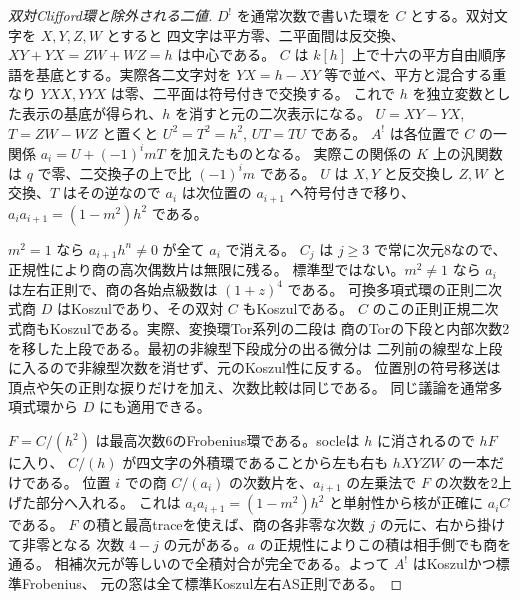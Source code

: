 \begin{proof}[双対Clifford環と除外される二値]
$D^!$ を通常次数で書いた環を $C$ とする。双対文字を $X,Y,Z,W$ とすると
四文字は平方零、二平面間は反交換、$XY+YX=ZW+WZ=h$ は中心である。
$C$ は $k[h]$ 上で十六の平方自由順序語を基底とする。実際各二文字対を
$YX=h-XY$ 等で並べ、平方と混合する重なり $YXX,YYX$ は零、二平面は符号付きで交換する。
これで $h$ を独立変数とした表示の基底が得られ、$h$ を消すと元の二次表示になる。
$U=XY-YX$, $T=ZW-WZ$ と置くと $U^2=T^2=h^2$, $UT=TU$ である。
$A^!$ は各位置で $C$ の一関係 $a_i=U+(-1)^i mT$ を加えたものとなる。
実際この関係の $K$ 上の汎関数は $q$ で零、二交換子の上で比 $(-1)^i m$ である。
$U$ は $X,Y$ と反交換し $Z,W$ と交換、$T$ はその逆なので $a_i$ は次位置の
$a_{i+1}$ へ符号付きで移り、$a_i a_{i+1}=(1-m^2)h^2$ である。

$m^2=1$ なら $a_{i+1}h^n\ne0$ が全て $a_i$ で消える。
$C_j$ は $j\ge3$ で常に次元8なので、正規性により商の高次偶数片は無限に残る。
標準型ではない。$m^2\ne1$ なら $a_i$ は左右正則で、商の各始点級数は $(1+z)^4$ である。
可換多項式環の正則二次式商 $D$ はKoszulであり、その双対 $C$ もKoszulである。
$C$ のこの正則正規二次式商もKoszulである。実際、変換環Tor系列の二段は
商のTorの下段と内部次数2を移した上段である。最初の非線型下段成分の出る微分は
二列前の線型な上段に入るので非線型次数を消せず、元のKoszul性に反する。
位置別の符号移送は頂点や矢の正則な捩りだけを加え、次数比較は同じである。
同じ議論を通常多項式環から $D$ にも適用できる。

$F=C/(h^2)$ は最高次数6のFrobenius環である。socleは $h$ に消されるので $hF$ に入り、
$C/(h)$ が四文字の外積環であることから左も右も $hXYZW$ の一本だけである。
位置 $i$ での商 $C/(a_i)$ の次数片を、$a_{i+1}$ の左乗法で $F$ の次数を2上げた部分へ入れる。
これは $a_i a_{i+1}=(1-m^2)h^2$ と単射性から核が正確に $a_i C$ である。
$F$ の積と最高traceを使えば、商の各非零な次数 $j$ の元に、右から掛けて非零となる
次数 $4-j$ の元がある。$a$ の正規性によりこの積は相手側でも商を通る。
相補次元が等しいので全積対合が完全である。よって $A^!$ はKoszulかつ標準Frobenius、
元の窓は全て標準Koszul左右AS正則である。
\end{proof}

